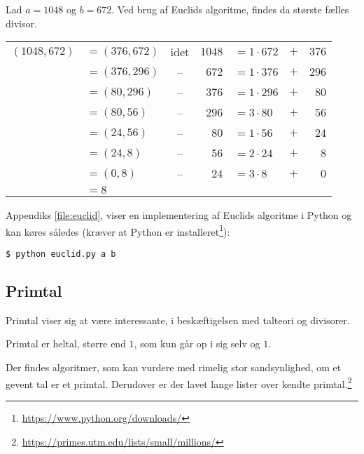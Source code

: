 \begin{eks}
    Lad \(a = 1048\) og \(b = 672\).
    Ved brug af Euclids algoritme, findes da største fælles divisor.
    \begin{center}
        \setlength{\tabcolsep}{5pt} %
        \begin{tabular}{r l c r l c r}
            \((1048, 672)\) & \(= (376, 672)\) & idet & \(1048\) & \(= 1 \cdot 672\) & \(+\) & \(376\)\\
                            & \(= (376, 296)\) & --   & \(672\) & \(= 1 \cdot 376\)  & \(+\) & \(296\)\\
                            & \(= (80, 296)\)  & --   & \(376\) & \(= 1 \cdot 296\)  & \(+\) & \(80\)\\
                            & \(= (80, 56)\)   & --   & \(296\) & \(= 3 \cdot 80\)   & \(+\) & \(56\)\\
                            & \(= (24, 56)\)   & --   & \(80\)  & \(= 1 \cdot 56\)   & \(+\) & \(24\)\\
                            & \(= (24, 8)\)    & --   & \(56\)  & \(= 2 \cdot 24\)   & \(+\) & \(8\)\\
                            & \(= (0, 8)\)     & --   & \(24\)  & \(= 3 \cdot 8\)    & \(+\) & \(0\)\\
                            & \(= 8\) & & & & &
        \end{tabular}
    \end{center}
\end{eks}
Appendiks \ref{file:euclid}, viser en implementering af Euclids algoritme i Python og kan køres således
(kræver at Python er installeret\footnote{\url{https://www.python.org/downloads/}}):
\begin{verbatim}
$ python euclid.py a b
\end{verbatim}


\subsection{Primtal}
Primtal viser sig at være interessante, i beskæftigelsen med talteori og divisorer.

\begin{definition}[Primtal]
    Primtal er heltal, større end \(1\), som kun går op i sig selv og \(1\).
\end{definition}

Der findes algoritmer, som kan vurdere med rimelig stor sandsynlighed, om et gevent tal er et primtal.\cite[21]{vestergaard}
Derudover er der lavet lange lister over kendte primtal.\footnote{\url{https://primes.utm.edu/lists/small/millions/}}


